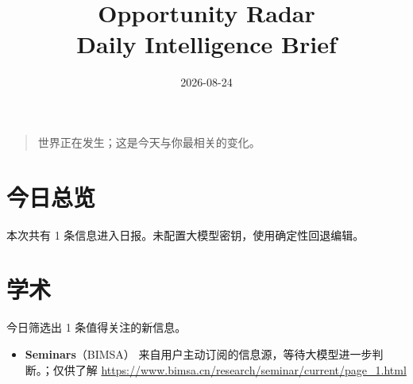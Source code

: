 \documentclass[11pt]{ctexart}
\title{Opportunity Radar\\Daily Intelligence Brief}
\date{2026-08-24}
\begin{document}
\maketitle
\begin{quote}\Large 世界正在发生；这是今天与你最相关的变化。\end{quote}
\section*{今日总览}
本次共有 1 条信息进入日报。未配置大模型密钥，使用确定性回退编辑。
\section*{学术}
今日筛选出 1 条值得关注的新信息。
\begin{itemize}
\item \textbf{Seminars}（BIMSA） 来自用户主动订阅的信息源，等待大模型进一步判断。；仅供了解 \url{https://www.bimsa.cn/research/seminar/current/page_1.html}
\end{itemize}
\end{document}
